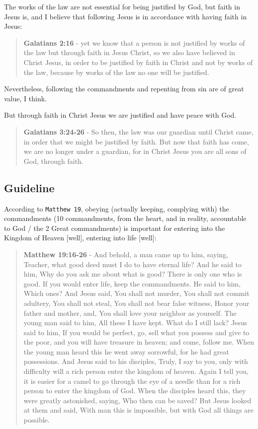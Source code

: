 \documentclass[11pt]{article}
\begin{document}
The works of the law are not essential for being justified by God, but faith in Jesus is, and I believe that following Jesus is in accordance with having faith in Jesus:

\begin{quote}
\textbf{Galatians 2:16} - yet we know that a person is not justified by works of the law but through faith in Jesus Christ, so we also have believed in Christ Jesus, in order to be justified by faith in Christ and not by works of the law, because by works of the law no one will be justified.
\end{quote}

Nevertheless, following the commandments and repenting from sin are of great value, I think.

But through faith in Christ Jesus we are justified and have peace with God.

\begin{quote}
\textbf{Galatians 3:24-26} - So then, the law was our guardian until Christ came, in order that we might be justified by faith. But now that faith has come, we are no longer under a guardian, for in Christ Jesus you are all sons of God, through faith.
\end{quote}

\subsection{Guideline}
\label{sec:org3950590}
According to \texttt{Matthew 19}, obeying (actually keeping, complying with) the commandments (10 commandments, from the heart, and in reality, accountable to God / the 2 Great commandments) is important for entering into the Kingdom of Heaven [well], entering into life [well]:

\begin{quote}
\textbf{Matthew 19:16-26} - And behold, a man came up to him, saying, Teacher, what good deed must I do to have eternal life? And he said to him, Why do you ask me about what is good? There is only one who is good. If you would enter life, keep the commandments. He said to him, Which ones? And Jesus said, You shall not murder, You shall not commit adultery, You shall not steal, You shall not bear false witness, Honor your father and mother, and, You shall love your neighbor as yourself. The young man said to him, All these I have kept. What do I still lack? Jesus said to him, If you would be perfect, go, sell what you possess and give to the poor, and you will have treasure in heaven; and come, follow me. When the young man heard this he went away sorrowful, for he had great possessions. And Jesus said to his disciples, Truly, I say to you, only with difficulty will a rich person enter the kingdom of heaven. Again I tell you, it is easier for a camel to go through the eye of a needle than for a rich person to enter the kingdom of God. When the disciples heard this, they were greatly astonished, saying, Who then can be saved? But Jesus looked at them and said, With man this is impossible, but with God all things are possible.
\end{quote}
\end{document}
